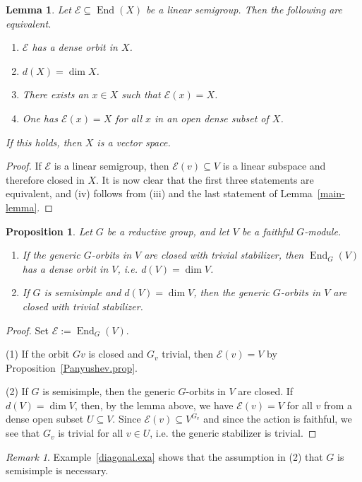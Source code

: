 \documentclass{amsart}
\newtheorem{prop}[thm]{Proposition}
\newtheorem{lem}[thm]{Lemma}
\theoremstyle{definition}
\theoremstyle{remark}
\newtheorem{rem}[thm]{Remark}
\begin{document}
\begin{lem}\label{DenseOrbit.lem}
Let ${\mathcal E} {\subseteq} \operatorname{End}(X)$ be a linear semigroup.
Then the following are equivalent.
\begin{enumerate}
\item[(i)] ${\mathcal E}$ has a dense orbit in $X$.
\item[(ii)] $d(X) = \dim X$.
\item[(iii)] There exists an $x \in X$ such that ${\mathcal E}(x)=X$.
\item[(iv)] One has ${\mathcal E}(x) = X$ for all $x$ in an open dense subset of $X$.
\end{enumerate}
If this holds, then $X$ is a vector space.
\end{lem}
\begin{proof}
If ${\mathcal E}$ is a linear semigroup, then ${\mathcal E}(v){\subseteq} V$ is a linear subspace and therefore closed in $X$. It is now clear that the first three statements are equivalent, and (iv) follows from (iii) and the last statement of Lemma~\ref{main-lemma}.
\end{proof}
\begin{prop}
Let $G$ be a reductive group, and let $V$ be a faithful $G$-module. 
\begin{enumerate}
\item
If the generic $G$-orbits in $V$ are closed with trivial stabilizer, then $\operatorname{End}_{G}(V)$ has a dense orbit in $V$, i.e.  
$d(V)=\dim V$.
\item
If $G$ is semisimple and $d(V)=\dim V$, then the generic $G$-orbits in $V$ are closed with trivial stabilizer.
\end{enumerate}
\end{prop}
\begin{proof} Set ${\mathcal E}:=\operatorname{End}_{G}(V)$.
\par\smallskip
(1) If the orbit $Gv$ is closed and $G_{v}$ trivial, then ${\mathcal E}(v) = V$ by Proposition~\ref{Panyushev.prop}.
\par\smallskip
(2) If $G$ is semisimple, then the generic $G$-orbits in $V$ are closed. If $d(V)=\dim V$, then, by the lemma above, we have ${\mathcal E}(v) = V$ for all $v$ from a dense open subset $U {\subseteq} V$. Since ${\mathcal E}(v) {\subseteq} V^{G_{v}}$ and since the action is faithful, we see that $G_{v}$ is trivial for all $v \in U$, i.e. the generic stabilizer is trivial.
\end{proof}
\begin{rem}
Example~\ref{diagonal.exa} shows that the assumption in (2) that $G$ is semisimple is necessary.
\end{rem}
\end{document}

